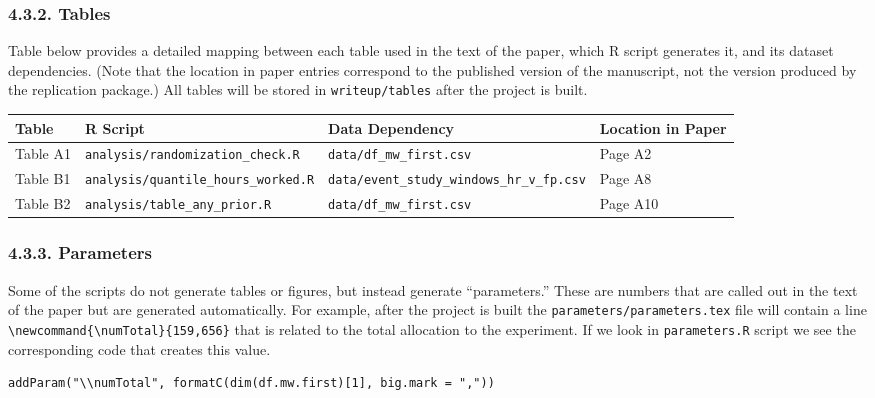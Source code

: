 \documentclass[10pt]{article}
\newenvironment{eightpt}{\begingroup\fontsize{8}{13}\selectfont}{\endgroup}
\begin{document}
\subsubsection*{4.3.2. Tables}

Table below provides a detailed mapping between each table used in the text of the paper, which R script generates it, and its dataset dependencies.
(Note that the location in paper entries correspond to the published version of the manuscript, not the version produced by the replication package.) 
All tables will be stored in \texttt{writeup/tables} after the project is built.

\begin{eightpt}
\begin{tabularx}{\textwidth}{@{}p{}p{}p{}>{\centering\arraybackslash}p{}@{}}
\toprule
Table & R Script & Data Dependency & Location in Paper \\
\midrule
Table A1 & \texttt{analysis/randomization\_check.R} & \texttt{data/df\_mw\_first.csv} & Page A2 \\
Table B1 & \texttt{analysis/quantile\_hours\_worked.R} & \texttt{data/event\_study\_windows\_hr\_v\_fp.csv} & Page A8 \\
Table B2 & \texttt{analysis/table\_any\_prior.R} & \texttt{data/df\_mw\_first.csv} & Page A10 \\
\bottomrule
\end{tabularx}
\end{eightpt}

\subsubsection*{4.3.3. Parameters}

Some of the scripts do not generate tables or figures, but instead generate ``parameters.''
These are numbers that are called out in the text of the paper but are generated automatically. 
For example, after the project is built the \texttt{parameters/parameters.tex} file will contain a line 
\verb|\newcommand{\numTotal}{159,656}| that is related to the total allocation to the experiment.
If we look in \texttt{parameters.R} script we see the corresponding code that creates this value.

\begin{verbatim}
addParam("\\numTotal", formatC(dim(df.mw.first)[1], big.mark = ","))
\end{verbatim}
\end{document}
